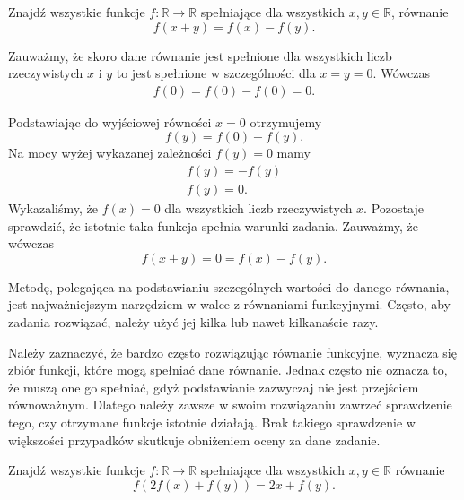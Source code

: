 


\noindent
Znajdź wszystkie funkcje $f:\mathbb{R}\rightarrow\mathbb{R}$ spełniające dla wszystkich $x, y \in \mathbb{R}$, równanie 
\[
    f(x + y) = f(x) − f(y).
\]


\noindent
Zauważmy, że skoro dane równanie jest spełnione dla wszystkich liczb rzeczywistych $x$ i $y$ to jest spełnione w szczególności dla $x = y = 0$. Wówczas
\begin{gather*}
    f(0) = f(0) - f(0) = 0.
\end{gather*}

\noindent
Podstawiając do wyjściowej równości $x = 0$ otrzymujemy
\[
    f(y) = f(0) - f(y).
\]
Na mocy wyżej wykazanej zależności $f(y) = 0$ mamy
\begin{gather*}
    f(y) = - f(y) \\
    f(y) = 0.
\end{gather*}
Wykazaliśmy, że $f(x) = 0$ dla wszystkich liczb rzeczywistych $x$. Pozostaje sprawdzić, że istotnie taka funkcja spełnia warunki zadania. Zauważmy, że wówczas
\[
    f(x + y) = 0 = f(x) - f(y).
\]

\vspace{20px}

\noindent
Metodę, polegająca na podstawianiu szczególnych wartości do danego równania, jest najważniejszym narzędziem w walce z równaniami funkcyjnymi. Często, aby zadania rozwiązać, należy użyć jej kilka lub nawet kilkanaście razy.

\vspace{10px}

\noindent
Należy zaznaczyć, że bardzo często rozwiązując równanie funkcyjne, wyznacza się zbiór funkcji, które mogą spełniać dane równanie. Jednak często nie oznacza to, że muszą one go spełniać, gdyż podstawianie zazwyczaj nie jest przejściem równoważnym. Dlatego należy zawsze w swoim rozwiązaniu zawrzeć sprawdzenie tego, czy otrzymane funkcje istotnie działają. Brak takiego sprawdzenie w większości przypadków skutkuje obniżeniem oceny za dane zadanie.

\vspace{20px}


\noindent
Znajdź wszystkie funkcje $f:\mathbb{R}\rightarrow\mathbb{R}$ spełniające dla wszystkich $x, y \in \mathbb{R}$ równanie 
\[
    f(2f(x) + f(y)) = 2x + f(y).
\]

